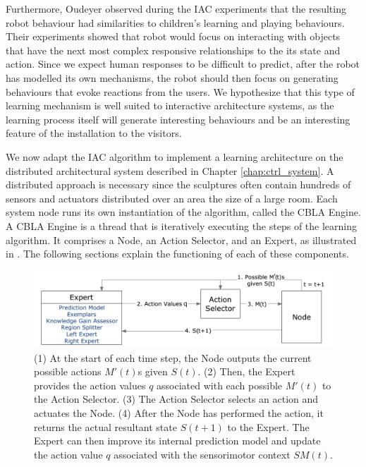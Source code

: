 Furthermore, Oudeyer \cite{Oudeyer2005} observed during the IAC experiments that the resulting robot behaviour had similarities to children's learning and playing behaviours. Their experiments showed that robot would focus on interacting with objects that have the next most complex responsive relationships to the its state and action. Since we expect human responses to be difficult to predict, after the robot has modelled its own mechanisms, the robot should then focus on generating behaviours that evoke reactions from the users. We hypothesize that this type of learning mechanism is well suited to interactive architecture systems, as the learning process itself will generate interesting behaviours and be an interesting feature of the installation to the visitors. 

We now adapt the IAC algorithm \cite{Oudeyer2007} to implement a learning architecture on the distributed architectural system described in Chapter \ref{chap:ctrl_system}. A distributed approach is necessary since the sculptures often contain hundreds of sensors and actuators distributed over an area the size of a large room. Each system node runs its own instantiation of the algorithm, called the CBLA Engine. A CBLA Engine is a thread that is iteratively executing the steps of the learning algorithm. It comprises a Node, an Action Selector, and an Expert, as illustrated in . The following sections explain the functioning of each of these components.

\begin{figure}[!htb]
	\centering
	\includegraphics[width=1.0 \textwidth]{"fig/cbla/Block Diagram CBLA"}
	\caption[Block diagram of the Curiosity Based Learning Algorithm]{(1) At the start of each time step, the Node outputs the current possible actions $M'(t)$s given $S(t)$. (2) Then, the Expert provides the action values $q$ associated with each possible $M'(t)$ to the Action Selector. (3) The Action Selector selects an action and actuates the Node. (4) After the Node has performed the action, it returns the actual resultant state $S(t+1)$ to the Expert. The Expert can then improve its internal prediction model and update the action value $q$ associated with the sensorimotor context $SM(t)$. }
	\label{fig:Block Diagram CBLA}
\end{figure}


